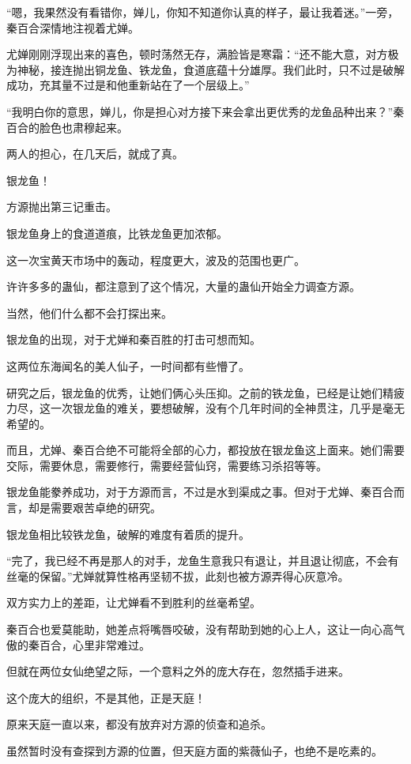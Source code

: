 \begin{this_body}
“嗯，我果然没有看错你，婵儿，你知不知道你认真的样子，最让我着迷。”一旁，秦百合深情地注视着尤婵。

尤婵刚刚浮现出来的喜色，顿时荡然无存，满脸皆是寒霜：“还不能大意，对方极为神秘，接连抛出铜龙鱼、铁龙鱼，食道底蕴十分雄厚。我们此时，只不过是破解成功，充其量不过是和他重新站在了一个层级上。”

“我明白你的意思，婵儿，你是担心对方接下来会拿出更优秀的龙鱼品种出来？”秦百合的脸色也肃穆起来。

两人的担心，在几天后，就成了真。

银龙鱼！

方源抛出第三记重击。

银龙鱼身上的食道道痕，比铁龙鱼更加浓郁。

这一次宝黄天市场中的轰动，程度更大，波及的范围也更广。

许许多多的蛊仙，都注意到了这个情况，大量的蛊仙开始全力调查方源。

当然，他们什么都不会打探出来。

银龙鱼的出现，对于尤婵和秦百胜的打击可想而知。

这两位东海闻名的美人仙子，一时间都有些懵了。

研究之后，银龙鱼的优秀，让她们俩心头压抑。之前的铁龙鱼，已经是让她们精疲力尽，这一次银龙鱼的难关，要想破解，没有个几年时间的全神贯注，几乎是毫无希望的。

而且，尤婵、秦百合绝不可能将全部的心力，都投放在银龙鱼这上面来。她们需要交际，需要休息，需要修行，需要经营仙窍，需要练习杀招等等。

银龙鱼能豢养成功，对于方源而言，不过是水到渠成之事。但对于尤婵、秦百合而言，却是需要艰苦卓绝的研究。

银龙鱼相比较铁龙鱼，破解的难度有着质的提升。

“完了，我已经不再是那人的对手，龙鱼生意我只有退让，并且退让彻底，不会有丝毫的保留。”尤婵就算性格再坚韧不拔，此刻也被方源弄得心灰意冷。

双方实力上的差距，让尤婵看不到胜利的丝毫希望。

秦百合也爱莫能助，她差点将嘴唇咬破，没有帮助到她的心上人，这让一向心高气傲的秦百合，心里非常难过。

但就在两位女仙绝望之际，一个意料之外的庞大存在，忽然插手进来。

这个庞大的组织，不是其他，正是天庭！

原来天庭一直以来，都没有放弃对方源的侦查和追杀。

虽然暂时没有查探到方源的位置，但天庭方面的紫薇仙子，也绝不是吃素的。


\end{this_body}
